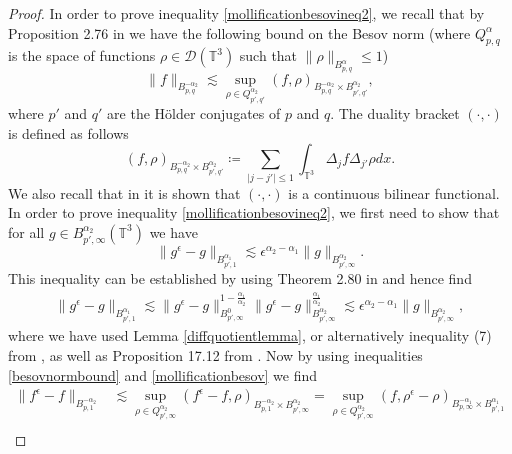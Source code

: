 \documentclass[12pt,a4paper]{article}
\theoremstyle{definition}
\theoremstyle{remark}
\numberwithin{equation}{section}
\begin{document}
\begin{appendices}
\begin{proof}
In order to prove inequality \eqref{mollificationbesovineq2}, we recall that by Proposition 2.76 in \cite{bahouri} we have the following bound on the Besov norm (where $Q^{\alpha}_{p,q}$ is the space of functions $\rho \in \mathcal{D} (\mathbb{T}^3)$ such that $\lVert \rho \rVert_{B^{\alpha}_{p,q}} \leq 1$)
\begin{equation} \label{besovnormbound}
\lVert f \rVert_{B^{-\alpha_2}_{p,q}} \lesssim \sup_{\rho \in Q^{\alpha_2}_{p',q'}} ( f , \rho )_{B^{-\alpha_2}_{p,q} \times B^{\alpha_2}_{p',q'}},
\end{equation}
where $p'$ and $q'$ are the Hölder conjugates of $p$ and $q$. The duality bracket $(\cdot, \cdot)$ is defined as follows 
\begin{equation}
(f,\rho)_{B^{-\alpha_2}_{p,q} \times B^{\alpha_2}_{p',q'}} \coloneqq \sum_{\lvert j - j' \rvert \leq 1} \int_{\mathbb{T}^3} \Delta_j f \Delta_{j'} \rho dx. 
\end{equation}
We also recall that in \cite[~Proposition 2.76]{bahouri} it is shown that $(\cdot, \cdot)$ is a continuous bilinear functional. In order to prove inequality \eqref{mollificationbesovineq2}, we first need to show that for all $g \in B^{\alpha_2}_{p',\infty} (\mathbb{T}^3)$ we have
\begin{equation} \label{mollificationbesov}
\lVert g^\epsilon - g \rVert_{B^{\alpha_1}_{p',1}} \lesssim \epsilon^{\alpha_2 - \alpha_1} \lVert g \rVert_{B^{\alpha_2}_{p',\infty}}.
\end{equation}
This inequality can be established by using Theorem 2.80 in \cite{bahouri} and hence find
\begin{align*}
\lVert g^\epsilon - g \rVert_{B^{\alpha_1}_{p',1}} \lesssim \lVert g^\epsilon - g \rVert_{B^0_{p',\infty}}^{1 - \frac{\alpha_1}{\alpha_2}} \lVert g^\epsilon - g \rVert_{B^{\alpha_2}_{p',\infty}}^{\frac{\alpha_1}{\alpha_2}} \lesssim \epsilon^{\alpha_2 - \alpha_1} \lVert g \rVert_{B^{\alpha_2}_{p',\infty}},
\end{align*}
where we have used Lemma \ref{diffquotientlemma}, or alternatively inequality (7) from \cite{constantin}, as well as Proposition 17.12 from \cite{leoni}. Now by using inequalities \eqref{besovnormbound} and \eqref{mollificationbesov} we find
\begin{align*}
\lVert f^\epsilon - f  \rVert_{B^{-\alpha_2}_{p,1}} &\lesssim \sup_{\rho \in Q^{\alpha_2}_{p',\infty}} ( f^\epsilon - f , \rho )_{B^{-\alpha_2}_{p,1} \times B^{\alpha_2}_{p',\infty}} = \sup_{\rho \in Q^{\alpha_2}_{p',\infty}} ( f, \rho^\epsilon - \rho )_{B^{-\alpha_1}_{p,\infty} \times B^{\alpha_1}_{p',1}} \\

\end{align*}
\end{proof}
\end{appendices}
\end{document}
